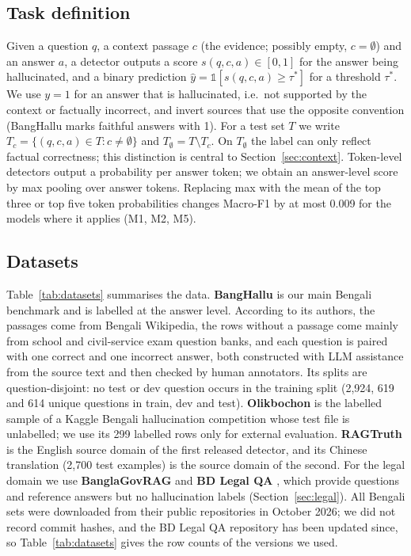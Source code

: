\documentclass[manuscript,screen,review]{acmart}
\begin{document}
\subsection{Task definition}\label{sec:task}
Given a question $q$, a context passage $c$ (the evidence; possibly empty, $c=\emptyset$) and an answer $a$, a detector outputs a score $s(q,c,a)\in[0,1]$ for the answer being hallucinated, and a binary prediction $\hat{y}=\mathbb{1}[s(q,c,a)\geq\tau^*]$ for a threshold $\tau^*$. We use $y=1$ for an answer that is hallucinated, i.e.\ not supported by the context or factually incorrect, and invert sources that use the opposite convention (BangHallu marks faithful answers with 1). For a test set $T$ we write $T_{c}=\{(q,c,a)\in T: c\neq\emptyset\}$ and $T_{\emptyset}=T\setminus T_{c}$. On $T_{\emptyset}$ the label can only reflect factual correctness; this distinction is central to Section~\ref{sec:context}. Token-level detectors output a probability per answer token; we obtain an answer-level score by max pooling over answer tokens. Replacing max with the mean of the top three or top five token probabilities changes Macro-F1 by at most 0.009 for the models where it applies (M1, M2, M5).

\subsection{Datasets}\label{sec:datasets}
Table~\ref{tab:datasets} summarises the data. \textbf{BangHallu} \cite{banghalluRepo} is our main Bengali benchmark and is labelled at the answer level. According to its authors, the passages come from Bengali Wikipedia, the rows without a passage come mainly from school and civil-service exam question banks, and each question is paired with one correct and one incorrect answer, both constructed with LLM assistance from the source text and then checked by human annotators. Its splits are question-disjoint: no test or dev question occurs in the training split (2,924, 619 and 614 unique questions in train, dev and test). \textbf{Olikbochon} \cite{olikbochonKaggle} is the labelled sample of a Kaggle Bengali hallucination competition whose test file is unlabelled; we use its 299 labelled rows only for external evaluation. \textbf{RAGTruth} \cite{niu2024ragtruth} is the English source domain of the first released detector, and its Chinese translation (2,700 test examples) is the source domain of the second. For the legal domain we use \textbf{BanglaGovRAG} \cite{banglagovragRepo} and \textbf{BD Legal QA} \cite{bdlegalqaRepo}, which provide questions and reference answers but no hallucination labels (Section~\ref{sec:legal}). All Bengali sets were downloaded from their public repositories in October 2026; we did not record commit hashes, and the BD Legal QA repository has been updated since, so Table~\ref{tab:datasets} gives the row counts of the versions we used.
\end{document}
